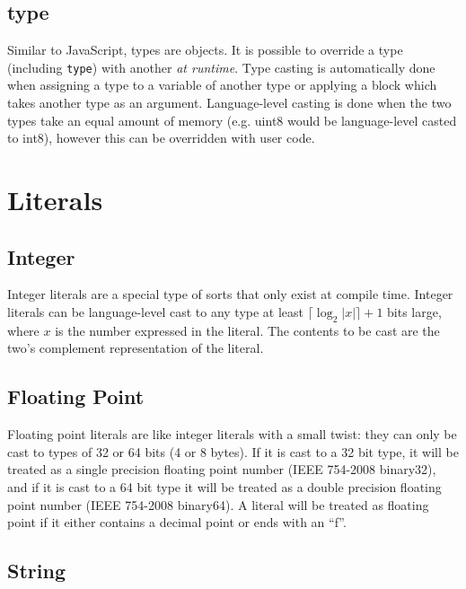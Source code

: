 \documentclass[letterpaper,titlepage]{scrreprt}
\begin{document}
\subsection{type}
\label{subsec:type}

Similar to JavaScript, types are objects. It is possible to override a type (including \lstinline{type}) with another \emph{at runtime}. Type casting is automatically done when assigning a type to a variable of another type or applying a block which takes another type as an argument. Language-level casting is done when the two types take an equal amount of memory (e.g. uint8 would be language-level casted to int8), however this can be overridden with user code.

\section{Literals}
\label{sec:Literals}

\subsection{Integer}
\label{subsec:Integer}

Integer literals are a special type of sorts that only exist at compile time. Integer literals can be language-level cast to any type at least $\lceil\log_2 |x|\rceil + 1$ bits large, where $x$ is the number expressed in the literal. The contents to be cast are the two's complement representation of the literal.

\subsection{Floating Point}
\label{subsec:FloatingPoint}

Floating point literals are like integer literals with a small twist: they can only be cast to types of 32 or 64 bits (4 or 8 bytes). If it is cast to a 32 bit type, it will be treated as a single precision floating point number (IEEE 754-2008 binary32), and if it is cast to a 64 bit type it will be treated as a double precision floating point number (IEEE 754-2008 binary64). A literal will be treated as floating point if it either contains a decimal point or ends with an ``f''.

\subsection{String}
\label{subsec:String}
\end{document}
